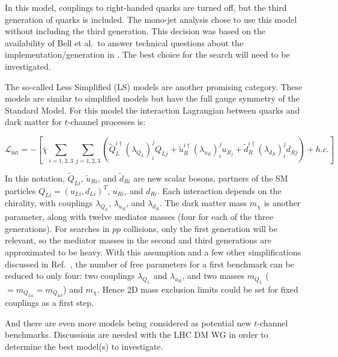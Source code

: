 \noindent In this model, couplings to right-handed quarks are turned off, but the third generation of quarks is included. The mono-jet analysis chose to use this model without including the third generation. This decision was based on the availability of Bell et al.\ to answer technical questions about the implementation/generation in \madgraph. The best choice for the \monoZ search will need to be investigated.

The so-called Less Simplified (LS) models \cite{Ko:2016zxg} are another promising category. These models are similar to simplified models but have the full gauge symmetry of the Standard Model. For this model the interaction Lagrangian between quarks and dark matter for $t$-channel processes is:

\begin{equation}
\mathcal{L}_\text{int} = - \left[ \bar{\chi} \sum_{i=1,2,3} \sum_{j=1,2,3} \left( \tilde{Q}_L^{i\dagger}(\lambda_{Q_L})_i^j Q_{Lj} + \tilde{u}_R^{i\dagger} (\lambda_{u_R})_i^j u_{R_j} + \tilde{d}_R^{i\dagger} (\lambda_{d_R})_i^j d_{Rj} \right) + h.c. \right]
\end{equation}

\noindent In this notation, $\tilde{Q}_{Li}$, $\tilde{u}_{Ri}$, and $\tilde{d}_{Ri}$ are new scalar bosons, partners of the SM particles $Q_{Li} = (u_{Li},d_{Li})^T$, $u_{Ri}$, and $d_{Ri}$. Each interaction depends on the chirality, with couplings $\lambda_{Q_L}$, $\lambda_{u_R}$, and $\lambda_{d_R}$. The dark matter mass $m_\chi$ is another parameter, along with twelve mediator masses (four for each of the three generations). For searches in $pp$ collisions, only the first generation will be relevant, so the mediator masses in the second and third generations are approximated to be heavy. With this assumption and a few other simplifications discussed in Ref.\ \cite{Ko:2016zxg}, the number of free parameters for a first benchmark can be reduced to only four: two couplings $\lambda_{Q_L}$ and $\lambda_{u_R}$, and two masses $m_{Q_L}$ ($= m_{Q_{Lu}} = m_{Q_{Ld}}$) and $m_\chi$. Hence 2D mass exclusion limits could be set for fixed couplings as a first step.

And there are even more models \cite{Bauer:2017fsw} being considered as potential new $t$-channel benchmarks. Discussions are needed with the LHC DM WG in order to determine the best model(s) to investigate.

